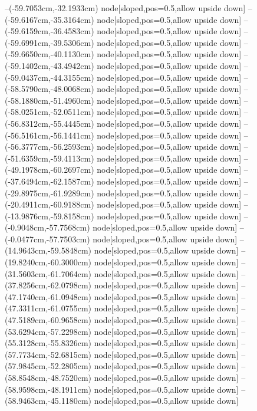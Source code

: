 --(-59.7053cm,-32.1933cm) node[sloped,pos=0.5,allow upside down]{\ArrowIn}
--(-59.6167cm,-35.3164cm) node[sloped,pos=0.5,allow upside down]{\ArrowIn}
--(-59.6159cm,-36.4583cm) node[sloped,pos=0.5,allow upside down]{\ArrowIn}
--(-59.6991cm,-39.5306cm) node[sloped,pos=0.5,allow upside down]{\ArrowIn}
--(-59.6650cm,-40.1130cm) node[sloped,pos=0.5,allow upside down]{\arrowIn}
--(-59.1402cm,-43.4942cm) node[sloped,pos=0.5,allow upside down]{\ArrowIn}
--(-59.0437cm,-44.3155cm) node[sloped,pos=0.5,allow upside down]{\arrowIn}
--(-58.5790cm,-48.0068cm) node[sloped,pos=0.5,allow upside down]{\ArrowIn}
--(-58.1880cm,-51.4960cm) node[sloped,pos=0.5,allow upside down]{\ArrowIn}
--(-58.0251cm,-52.0511cm) node[sloped,pos=0.5,allow upside down]{\arrowIn}
--(-56.8312cm,-55.4445cm) node[sloped,pos=0.5,allow upside down]{\ArrowIn}
--(-56.5161cm,-56.1441cm) node[sloped,pos=0.5,allow upside down]{\arrowIn}
--(-56.3777cm,-56.2593cm) node[sloped,pos=0.5,allow upside down]{\arrowIn}
--(-51.6359cm,-59.4113cm) node[sloped,pos=0.5,allow upside down]{\ArrowIn}
--(-49.1978cm,-60.2697cm) node[sloped,pos=0.5,allow upside down]{\ArrowIn}
--(-37.6494cm,-62.1587cm) node[sloped,pos=0.5,allow upside down]{\ArrowIn}
--(-29.8975cm,-61.9289cm) node[sloped,pos=0.5,allow upside down]{\ArrowIn}
--(-20.4911cm,-60.9188cm) node[sloped,pos=0.5,allow upside down]{\ArrowIn}
--(-13.9876cm,-59.8158cm) node[sloped,pos=0.5,allow upside down]{\ArrowIn}
--(-0.9048cm,-57.7568cm) node[sloped,pos=0.5,allow upside down]{\ArrowIn}
--(-0.0477cm,-57.7503cm) node[sloped,pos=0.5,allow upside down]{\arrowIn}
--(14.9643cm,-59.5848cm) node[sloped,pos=0.5,allow upside down]{\ArrowIn}
--(19.8240cm,-60.3000cm) node[sloped,pos=0.5,allow upside down]{\ArrowIn}
--(31.5603cm,-61.7064cm) node[sloped,pos=0.5,allow upside down]{\ArrowIn}
--(37.8256cm,-62.0798cm) node[sloped,pos=0.5,allow upside down]{\ArrowIn}
--(47.1740cm,-61.0948cm) node[sloped,pos=0.5,allow upside down]{\ArrowIn}
--(47.3311cm,-61.0755cm) node[sloped,pos=0.5,allow upside down]{\arrowIn}
--(47.5189cm,-60.9658cm) node[sloped,pos=0.5,allow upside down]{\arrowIn}
--(53.6294cm,-57.2298cm) node[sloped,pos=0.5,allow upside down]{\ArrowIn}
--(55.3128cm,-55.8326cm) node[sloped,pos=0.5,allow upside down]{\ArrowIn}
--(57.7734cm,-52.6815cm) node[sloped,pos=0.5,allow upside down]{\ArrowIn}
--(57.9845cm,-52.2805cm) node[sloped,pos=0.5,allow upside down]{\arrowIn}
--(58.8548cm,-48.7520cm) node[sloped,pos=0.5,allow upside down]{\ArrowIn}
--(58.9598cm,-48.1911cm) node[sloped,pos=0.5,allow upside down]{\arrowIn}
--(58.9463cm,-45.1180cm) node[sloped,pos=0.5,allow upside down]{\ArrowIn}
